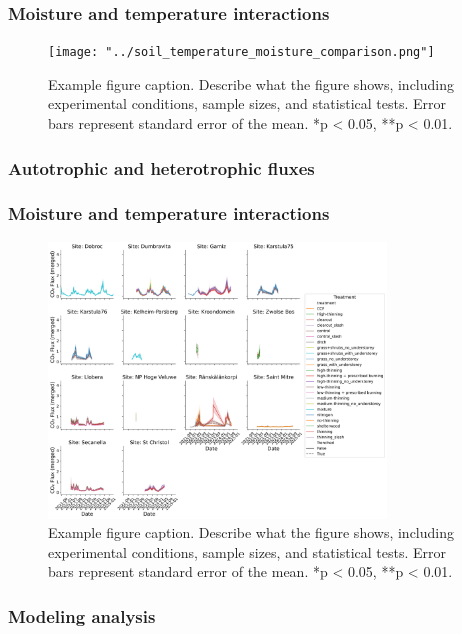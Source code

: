 \documentclass[12pt,a4paper]{article}
\begin{document}
\subsubsection{Moisture and temperature interactions}
\begin{figure}[H]
    \centering
    \texttt{[image: "../soil\_temperature\_moisture\_comparison.png"]}
    \caption{Example figure caption. Describe what the figure shows, including experimental conditions, sample sizes, and statistical tests. Error bars represent standard error of the mean. *p < 0.05, **p < 0.01.}
    \label{fig:temp_moisture}
\end{figure}


\subsubsection{Autotrophic and heterotrophic fluxes}

\subsubsection{Moisture and temperature interactions}
\begin{figure}[H]
    \centering
    \includegraphics[width=0.8\textwidth]{"../co2_flux_timeseries.png"}
    \caption{Example figure caption. Describe what the figure shows, including experimental conditions, sample sizes, and statistical tests. Error bars represent standard error of the mean. *p < 0.05, **p < 0.01.}
    \label{fig:timeseries}
\end{figure}




\subsubsection{Modeling analysis}
\end{document}
